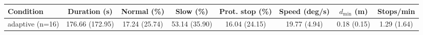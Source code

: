 \begin{tabular}{lccccccc}
\hline
Condition & Duration (s) & Normal (\%) & Slow (\%) & Prot. stop (\%) & Speed (deg/s) & $d_{\min}$ (m) & Stops/min \\
\hline
adaptive (n=16) & 176.66 (172.95) & 17.24 (25.74) & 53.14 (35.90) & 16.04 (24.15) & 19.77 (4.94) & 0.18 (0.15) & 1.29 (1.64) \\
\hline
\end{tabular}
